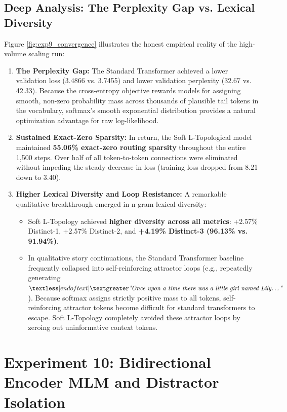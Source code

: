\subsection{Deep Analysis: The Perplexity Gap vs. Lexical Diversity}
Figure \ref{fig:exp9_convergence} illustrates the honest empirical reality of the high-volume scaling run:
\begin{enumerate}
    \item \textbf{The Perplexity Gap:} The Standard Transformer achieved a lower validation loss (3.4866 vs. 3.7455) and lower validation perplexity (32.67 vs. 42.33). Because the cross-entropy objective rewards models for assigning smooth, non-zero probability mass across thousands of plausible tail tokens in the vocabulary, softmax's smooth exponential distribution provides a natural optimization advantage for raw log-likelihood.
    \item \textbf{Sustained Exact-Zero Sparsity:} In return, the Soft L-Topological model maintained \textbf{55.06\% exact-zero routing sparsity} throughout the entire 1,500 steps. Over half of all token-to-token connections were eliminated without impeding the steady decrease in loss (training loss dropped from 8.21 down to 3.40).
    \item \textbf{Higher Lexical Diversity and Loop Resistance:} A remarkable qualitative breakthrough emerged in n-gram lexical diversity:
    \begin{itemize}
        \item Soft L-Topology achieved \textbf{higher diversity across all metrics}: +2.57\% Distinct-1, +2.57\% Distinct-2, and \textbf{+4.19\% Distinct-3 (96.13\% vs. 91.94\%)}.
        \item In qualitative story continuations, the Standard Transformer baseline frequently collapsed into self-reinforcing attractor loops (e.g., repeatedly generating $\textless|endoftext|\textgreater \textit{"Once upon a time there was a little girl named Lily\dots"}$). Because softmax assigns strictly positive mass to all tokens, self-reinforcing attractor tokens become difficult for standard transformers to escape. Soft L-Topology completely avoided these attractor loops by zeroing out uninformative context tokens.
    \end{itemize}
\end{enumerate}

\section{Experiment 10: Bidirectional Encoder MLM and Distractor Isolation}
\label{sec:exp10}

